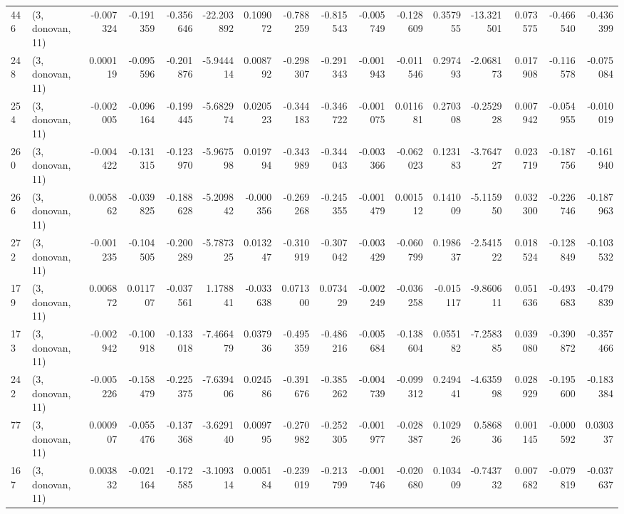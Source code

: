 \begin{tabular}{llrrrrrrrrrrrrrr}
446 &  (3, donovan, 11) &  -0.007324 & -0.191359 & -0.356646 &   -22.203892 &   0.109072 &  -0.788259 &  -0.815543 & -0.005749 & -0.128609 &  0.357955 &  -13.321501 &  0.073575 & -0.466540 & -0.436399 \\
248 &  (3, donovan, 11) &   0.000119 & -0.095596 & -0.201876 &    -5.944414 &   0.008792 &  -0.298307 &  -0.291343 & -0.001943 & -0.011546 &  0.297493 &   -2.068173 &  0.017908 & -0.116578 & -0.075084 \\
254 &  (3, donovan, 11) &  -0.002005 & -0.096164 & -0.199445 &    -5.682974 &   0.020523 &  -0.344183 &  -0.346722 & -0.001075 &  0.011681 &  0.270308 &   -0.252928 &  0.007942 & -0.054955 & -0.010019 \\
260 &  (3, donovan, 11) &  -0.004422 & -0.131315 & -0.123970 &    -5.967598 &   0.019794 &  -0.343989 &  -0.344043 & -0.003366 & -0.062023 &  0.123183 &   -3.764727 &  0.023719 & -0.187756 & -0.161940 \\
266 &  (3, donovan, 11) &   0.005862 & -0.039825 & -0.188628 &    -5.209842 &  -0.000356 &  -0.269268 &  -0.245355 & -0.001479 &  0.001512 &  0.141009 &   -5.115950 &  0.032300 & -0.226746 & -0.187963 \\
272 &  (3, donovan, 11) &  -0.001235 & -0.104505 & -0.200289 &    -5.787325 &   0.013247 &  -0.310919 &  -0.307042 & -0.003429 & -0.060799 &  0.198637 &   -2.541522 &  0.018524 & -0.128849 & -0.103532 \\
179 &  (3, donovan, 11) &   0.006872 &  0.011707 & -0.037561 &     1.178841 &  -0.033638 &   0.071300 &   0.073429 & -0.002249 & -0.036258 & -0.015117 &   -9.860611 &  0.051636 & -0.493683 & -0.479839 \\
173 &  (3, donovan, 11) &  -0.002942 & -0.100918 & -0.133018 &    -7.466479 &   0.037936 &  -0.495359 &  -0.486216 & -0.005684 & -0.138604 &  0.055182 &   -7.258385 &  0.039080 & -0.390872 & -0.357466 \\
242 &  (3, donovan, 11) &  -0.005226 & -0.158479 & -0.225375 &    -7.639406 &   0.024586 &  -0.391676 &  -0.385262 & -0.004739 & -0.099312 &  0.249441 &   -4.635998 &  0.028929 & -0.195600 & -0.183384 \\
77  &  (3, donovan, 11) &   0.000907 & -0.055476 & -0.137368 &    -3.629140 &   0.009795 &  -0.270982 &  -0.252305 & -0.001977 & -0.028387 &  0.102926 &    0.586836 &  0.001145 & -0.000592 &  0.030337 \\
167 &  (3, donovan, 11) &   0.003832 & -0.021164 & -0.172585 &    -3.109314 &   0.005184 &  -0.239019 &  -0.213799 & -0.001746 & -0.020680 &  0.103409 &   -0.743732 &  0.007682 & -0.079819 & -0.037637 \\

\end{tabular}
